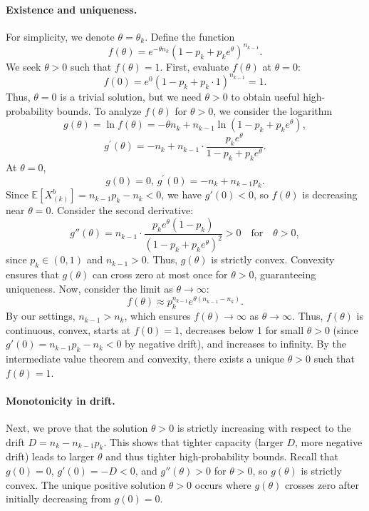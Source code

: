 \paragraph{Existence and uniqueness.} For simplicity, we denote $\theta=\theta_k$. Define the function
\[
f(\theta) = e^{-\theta n_{k}} (1 - p_k + p_k e^{\theta})^{n_{k-1}}.
\]
We seek \(\theta > 0\) such that \(f(\theta) = 1\). First, evaluate \(f(\theta)\) at \(\theta = 0\):
\[
f(0) = e^{0} (1 - p_k + p_k \cdot 1)^{n_{k-1}} = 1.
\]
Thus, \(\theta = 0\) is a trivial solution, but we need \(\theta > 0\) to obtain useful high-probability bounds. To analyze $f(\theta)$ for $\theta>0$, we consider the logarithm
$$g(\theta) = \ln f(\theta) = -\theta n_{k} + n_{k-1} \ln(1 - p_k + p_k e^{\theta}),$$
$$ g^\prime(\theta) = -n_{k} + n_{k-1} \cdot \frac{p_k e^{\theta}}{1 - p_k + p_k e^{\theta}}.$$
At \(\theta = 0\),
\[
g(0)=0,\,g^\prime(0) = -n_{k} + n_{k-1} p_k.
\]
Since \(\mathbb{E}[X^b_{(k)}] = n_{k-1} p_k - n_{k} < 0\), we have \(g'(0) < 0\), so \(f(\theta)\) is decreasing near \(\theta = 0\). Consider the second derivative:
\[
g''(\theta) = n_{k-1} \cdot \frac{p_k e^{\theta} (1 - p_k)}{(1 - p_k + p_k e^{\theta})^2} > 0 \quad \text{for} \quad \theta > 0,
\]
since \(p_k \in (0, 1)\) and \(n_{k-1} > 0\). Thus, \(g(\theta)\) is strictly convex. Convexity ensures that $g(\theta)$ can cross zero at most once for $\theta>0$, guaranteeing uniqueness. Now, consider the limit as \(\theta \to \infty\):
\[
f(\theta) \approx p_k^{n_{k-1}} e^{\theta (n_{k-1} - n_{k})}.
\]
By our settings, $n_{k-1}>n_k$, which ensures $f(\theta)\to \infty$ as $\theta\to \infty$. Thus, \(f(\theta)\) is continuous, convex, starts at \(f(0) = 1\), decreases below 1 for small \(\theta > 0\) (since $g'(0) = n_{k-1}p_k - n_k < 0$ by negative drift), and increases to infinity. By the intermediate value theorem and convexity, there exists a unique \(\theta > 0\) such that \(f(\theta) = 1\).

\paragraph{Monotonicity in drift.} Next, we prove that the solution $\theta>0$ is strictly increasing with respect to the drift \(D = n_k - n_{k-1} p_k\). This shows that tighter capacity (larger $D$, more negative drift) leads to larger $\theta$ and thus tighter high-probability bounds. Recall that \(g(0) = 0\), \(g'(0) = -D < 0\), and \(g''(\theta) > 0\) for \(\theta > 0\), so \(g(\theta)\) is strictly convex. The unique positive solution \(\theta > 0\) occurs where \(g(\theta)\) crosses zero after initially decreasing from \(g(0) = 0\).

